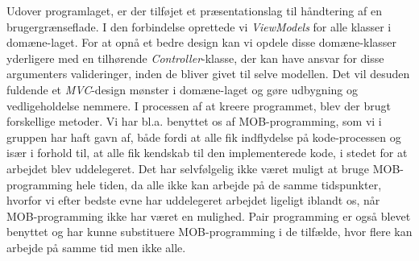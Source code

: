 Udover programlaget, er der tilføjet et præsentationslag til håndtering af en brugergrænseflade. I den forbindelse oprettede vi \textit{ViewModels} for alle klasser i domæne-laget. For at opnå et bedre design kan vi opdele disse domæne-klasser yderligere med en tilhørende \textit{Controller}-klasse, der kan have ansvar for disse argumenters valideringer, inden de bliver givet til selve modellen. Det vil desuden fuldende et \textit{MVC}-design mønster i domæne-laget og gøre udbygning og vedligeholdelse nemmere.
\newline
I processen af at kreere programmet, blev der brugt forskellige metoder. Vi har bl.a. benyttet os af MOB-programming, som vi i gruppen har haft gavn af, både fordi at alle fik indflydelse på kode-processen og især i forhold til, at alle fik kendskab til den implementerede kode, i stedet for at arbejdet blev uddelegeret. Det har selvfølgelig ikke været muligt at bruge MOB-programming hele tiden, da alle ikke kan arbejde på de samme tidspunkter, hvorfor vi efter bedste evne har uddelegeret arbejdet ligeligt iblandt os, når MOB-programming ikke har været en mulighed. Pair programming er også blevet benyttet og har kunne substituere MOB-programming i de tilfælde, hvor flere kan arbejde på samme tid men ikke alle.